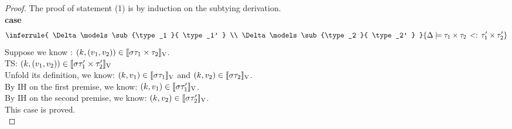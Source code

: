 \begin{proof} The proof of statement (1) is by induction on the
  subtying derivation.\\
\textbf{case}
\[ 
 \inferrule{
     \Delta \models \sub{\type_1 }{ \type_1'  } \\
         \Delta \models \sub{\type_2 }{ \type_2'  }
    }{
       \Delta \models \sub{\type_1 \times \type_2 }{ \type_1' \times \type_2'  }
    }
\]
Suppose we know : $ (k, (v_1, v_2)) \in [\![ \sigma \tau_1 \times \tau_2 ]\!]_{\text{V}} $.\\
TS:  $ (k, (v_1, v_2)) \in [\![ \sigma \tau_1' \times \tau_2' ]\!]_{\text{V}} $ \\
Unfold its definition, we know: $  (k, v_1 ) \in [\![ \sigma \tau_1 ]\!]_{\text{V}} $ and $  (k, v_2 ) \in [\![ \sigma \tau_2 ]\!]_{\text{V}} $.\\
By IH on the first premise, we know: $  (k, v_1 ) \in [\![ \sigma \tau_1' ]\!]_{\text{V}} $.\\
By IH on the second premise, we know: $  (k, v_2 ) \in [\![ \sigma \tau_2' ]\!]_{\text{V}} $.\\
This case is proved.\\


\end{proof}
